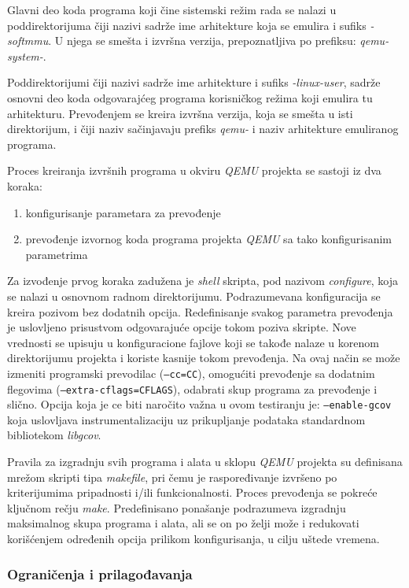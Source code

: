 \documentclass[12pt,oneside]{memoir}
\newcommand{\kod}[1]{\texttt{#1}}
\newcommand{\strano}[1]{\textit{#1}}
\begin{document}
Glavni deo koda programa koji čine sistemski režim rada se nalazi u poddirektorijuma čiji nazivi sadrže ime arhitekture koja se emulira i sufiks \strano{-softmmu}. U njega se smešta i izvršna verzija, prepoznatljiva po prefiksu: \strano{qemu-system-}.

Poddirektorijumi čiji nazivi sadrže ime arhitekture i sufiks \strano{-linux-user}, sadrže osnovni deo koda odgovarajćeg programa korisničkog režima koji emulira tu arhitekturu. Prevođenjem se kreira izvršna verzija, koja se smešta u isti direktorijum, i čiji naziv sačinjavaju prefiks \strano{qemu-} i naziv arhitekture emuliranog programa.

Proces kreiranja izvršnih programa u okviru \strano{QEMU} projekta se sastoji iz dva koraka:
\begin{enumerate}
\item konfigurisanje parametara za prevođenje
\item prevođenje izvornog koda programa projekta \strano{QEMU} sa tako konfigurisanim parametrima
\end{enumerate}
Za izvođenje prvog koraka zadužena je \strano{shell} skripta, pod nazivom \strano{configure}, koja se nalazi u osnovnom radnom direktorijumu. Podrazumevana konfiguracija se kreira pozivom bez dodatnih opcija. Redefinisanje svakog parametra prevođenja je uslovljeno prisustvom odgovarajuće opcije tokom poziva skripte. Nove vrednosti se upisuju u konfiguracione fajlove koji se takođe nalaze u korenom direktorijumu projekta i koriste kasnije tokom prevođenja. Na ovaj način se može izmeniti programski prevodilac (\kod{--cc=CC}), omogućiti prevođenje sa dodatnim flegovima (\kod{--extra-cflags=CFLAGS}), odabrati skup programa za prevođenje i slično. Opcija koja je ce biti naročito važna u ovom testiranju je: \kod{--enable-gcov} koja uslovljava instrumentalizaciju uz prikupljanje podataka standardnom bibliotekom \strano{libgcov}.

Pravila za izgradnju svih programa i alata u sklopu \strano{QEMU} projekta su definisana mrežom skripti tipa \strano{makefile}, pri čemu je raspoređivanje izvršeno po kriterijumima pripadnosti i/ili funkcionalnosti. Proces prevođenja se pokreće ključnom rečju \strano{make}. Predefinisano ponašanje podrazumeva izgradnju maksimalnog skupa programa i alata, ali se on po želji može i redukovati korišćenjem određenih opcija prilikom konfigurisanja, u cilju uštede vremena.

\subsubsection{Ograničenja i prilagođavanja}
\end{document}
